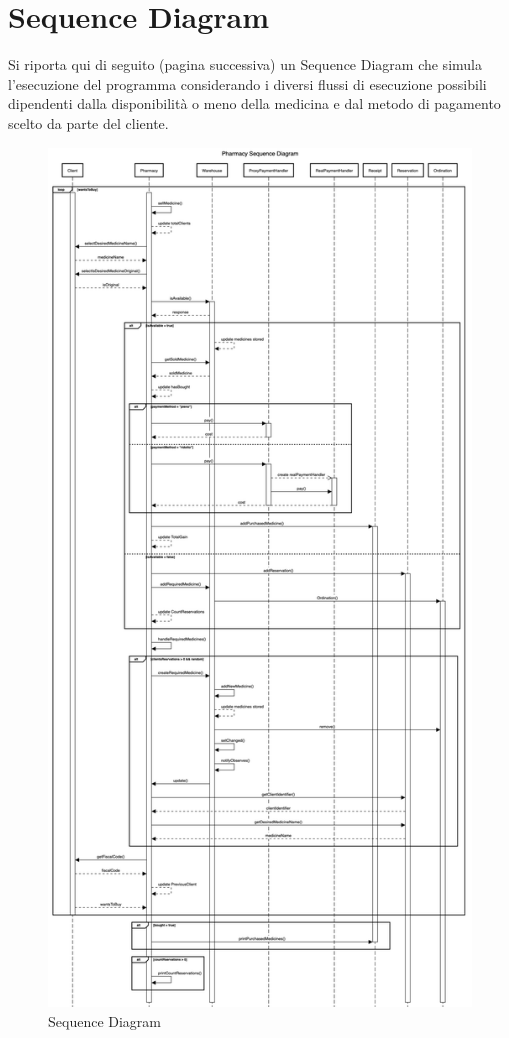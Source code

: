 \documentclass[a4paper, 10pt]{report}
\begin{document}
\section{Sequence Diagram}
Si riporta qui di seguito (pagina successiva) un Sequence Diagram che simula l'esecuzione del programma considerando i diversi flussi di esecuzione possibili dipendenti dalla disponibilità o meno della medicina e dal metodo di pagamento scelto da parte del cliente.
\begin{figure}[t]
\centering
\includegraphics[scale=0.2,angle=0]{PharmacySD.png}
\caption{Sequence Diagram}
\end{figure}
\end{document}
